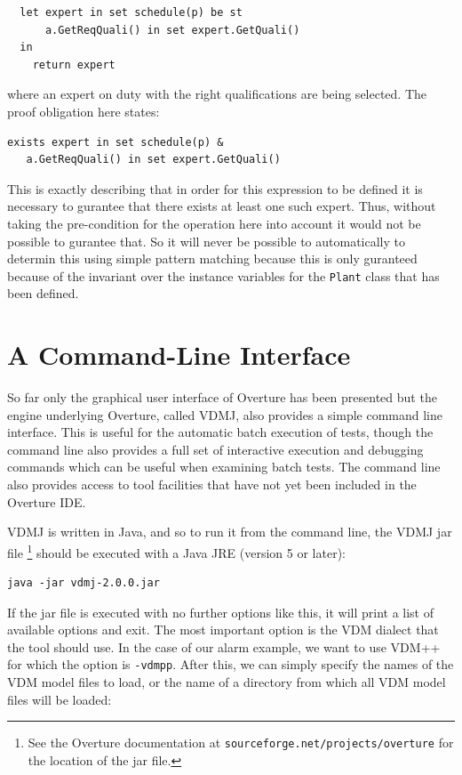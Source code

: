 \begin{lstlisting}
  let expert in set schedule(p) be st
      a.GetReqQuali() in set expert.GetQuali()
  in
    return expert
\end{lstlisting}

\noindent where an expert on duty with the right qualifications are
being selected. The proof obligation here states:

\begin{lstlisting}
exists expert in set schedule(p) & 
   a.GetReqQuali() in set expert.GetQuali()
\end{lstlisting}

\noindent This is exactly describing that in order for this expression
to be defined it is necessary to gurantee that there exists at least
one such expert. Thus, without taking the pre-condition for the
operation here into account it would not be possible to gurantee
that. So it will never be possible to automatically to determin this
using simple pattern matching because this is only guranteed because
of the invariant over the instance variables for the \texttt{Plant}
class that has been defined.
 
\section{A Command-Line Interface}\label{sec:cmdline}

So far only the graphical user interface of Overture has been
presented but the engine underlying Overture, called VDMJ, also
provides a simple command line interface.  This is useful for the
automatic batch execution of tests, though the command line also
provides a full set of interactive execution and debugging commands
which can be useful when examining batch tests. The command line also
provides access to tool facilities that have not yet been included in
the Overture IDE.

VDMJ is written in Java, and so to run it from the command line, the
VDMJ jar file \footnote{See the Overture documentation at
  \texttt{sourceforge.net/projects/overture} for the location of the
  jar file.}  should be executed with a Java JRE (version 5 or later):

\lstset{style=tool,language=}
\begin{lstlisting}
java -jar vdmj-2.0.0.jar
\end{lstlisting}

\noindent If the jar file is executed with no further options like this, it will
print a list of available options and exit. The most important option is the VDM
dialect that the tool should use. In the case of our alarm example, we want to
use VDM++ for which the option is \verb|-vdmpp|. After this, we can simply
specify the names of the VDM model files to load, or the name of a
directory from which all VDM model files will be loaded:

